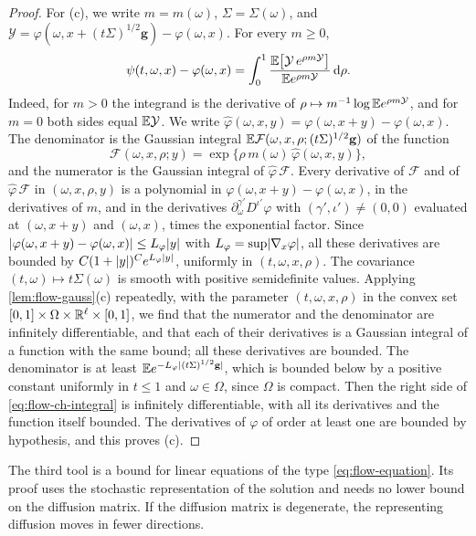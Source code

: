 \begin{proof}
For (c), we write $m=m(\omega)$, $\Sigma=\Sigma(\omega)$, and
$\mathcal Y=\varphi(\omega,x+(t\Sigma)^{1/2}\mathbf g)-\varphi(\omega,x)$. For every $m\ge0$,
\begin{equation}\label{eq:flow-ch-integral}
 \psi(t,\omega,x)-\varphi(\omega,x)
 =\int_0^1\frac{\mathbb E\bigl[\mathcal Y\,e^{\rho m\mathcal Y}\bigr]}{\mathbb E e^{\rho m\mathcal Y}}\,\mathrm d\rho.
\end{equation}
Indeed, for $m>0$ the integrand is the derivative of
$\rho\mapsto m^{-1}\log\mathbb E e^{\rho m\mathcal Y}$, and for $m=0$ both sides equal $\mathbb E \mathcal Y$.
We write $\widehat\varphi(\omega,x,y)=\varphi(\omega,x+y)-\varphi(\omega,x)$. The
denominator is the Gaussian integral $\mathbb E\mathcal F(\omega,x,\rho;(t\Sigma)^{1/2}\mathbf g)$ of
the function
\[
 \mathcal F(\omega,x,\rho;y)=\exp\bigl\{\rho\,m(\omega)\,\widehat\varphi(\omega,x,y)\bigr\},
\]
and the numerator is the Gaussian integral of $\widehat\varphi\,\mathcal F$. Every
derivative of $\mathcal F$ and of $\widehat\varphi\,\mathcal F$ in $(\omega,x,\rho,y)$ is a
polynomial in
$\varphi(\omega,x+y)-\varphi(\omega,x)$, in the derivatives of $m$, and in the
derivatives $\partial^{\gamma'}_\omega D^{\iota'}\varphi$ with
$(\gamma',\iota')\ne(0,0)$ evaluated at $(\omega,x+y)$ and $(\omega,x)$, times
the exponential factor. Since $\lvert \varphi(\omega,x+y)-\varphi(\omega,x)\rvert\le
L_\varphi\lvert y\rvert$ with $L_\varphi=\sup\lvert \nabla_x\varphi\rvert$, all these derivatives are bounded by
$C(1+\lvert y\rvert)^{C}e^{L_\varphi\lvert y\rvert}$, uniformly in $(t,\omega,x,\rho)$. The covariance
$(t,\omega)\mapsto t\Sigma(\omega)$ is smooth with positive semidefinite values.
Applying \cref{lem:flow-gauss}(c) repeatedly, with the parameter
$(t,\omega,x,\rho)$ in the convex set $[0,1]\times\Omega\times\mathbb R^\ell\times[0,1]$,
we find that the numerator and the denominator are infinitely differentiable,
and that each of their derivatives is a Gaussian integral of a function with the
same bound; all these derivatives are bounded. The denominator is
at least $\mathbb E e^{-L_\varphi\lvert (t\Sigma)^{1/2}\mathbf g\rvert}$, which is bounded below by a positive
constant uniformly in $t\le1$ and $\omega\in\Omega$, since $\Omega$ is compact.
Then the right side of \eqref{eq:flow-ch-integral} is infinitely
differentiable, with all its derivatives and the function itself bounded. The
derivatives of $\varphi$ of order at least one are bounded by hypothesis, and
this proves (c).
\end{proof}

The third tool is a bound for linear equations of the type
\eqref{eq:flow-equation}. Its proof uses the stochastic representation of the
solution and needs no lower bound on the diffusion matrix. If the
diffusion matrix is degenerate, the representing diffusion moves in fewer
directions.

